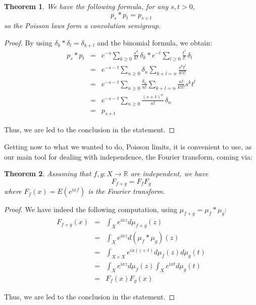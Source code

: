 \documentclass[12pt]{amsbook}
\newtheorem{theorem}{Theorem}[chapter]
\begin{document}

\begin{theorem}
We have the following formula, for any $s,t>0$,
$$p_s*p_t=p_{s+t}$$
so the Poisson laws form a convolution semigroup.
\end{theorem}

\begin{proof}
By using $\delta_k*\delta_l=\delta_{k+l}$ and the binomial formula, we obtain:
\begin{eqnarray*}
p_s*p_t
&=&e^{-s}\sum_{k\geq0}\frac{s^k}{k!}\,\delta_k*e^{-t}\sum_{l\geq0}\frac{t^l}{l!}\,\delta_l\\
&=&e^{-s-t}\sum_{n\geq0}\delta_n\sum_{k+l=n}\frac{s^kt^l}{k!l!}\\
&=&e^{-s-t}\sum_{n\geq0}\frac{\delta_n}{n!}\sum_{k+l=n}\frac{n!}{k!l!}s^kt^l\\\
&=&e^{-s-t}\sum_{n\geq0}\frac{(s+t)^n}{n!}\,\delta_n\\
&=&p_{s+t}
\end{eqnarray*}

Thus, we are led to the conclusion in the statement.
\end{proof}

Getting now to what we wanted to do, Poisson limits, it is convenient to use, as our main tool for dealing with independence, the Fourier transform, coming via:


\begin{theorem}
Assuming that $f,g:X\to\mathbb R$ are independent, we have
$$F_{f+g}=F_fF_g$$
where $F_f(x)=E(e^{ixf})$ is the Fourier transform.
\end{theorem}

\begin{proof}
We have indeed the following computation, using $\mu_{f+g}=\mu_f*\mu_g$:
\begin{eqnarray*}
F_{f+g}(x)
&=&\int_Xe^{ixz}d\mu_{f+g}(z)\\
&=&\int_Xe^{ixz}d(\mu_f*\mu_g)(z)\\
&=&\int_{X\times X}e^{ix(z+t)}d\mu_f(z)d\mu_g(t)\\
&=&\int_Xe^{ixz}d\mu_f(z)\int_Xe^{ixt}d\mu_g(t)\\
&=&F_f(x)F_g(x)
\end{eqnarray*}

Thus, we are led to the conclusion in the statement.
\end{proof}
\end{document}
